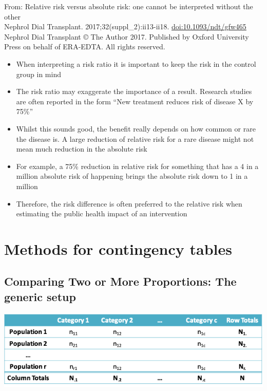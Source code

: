 \documentclass[
]{book}
\providecommand{\tightlist}{%
  \setlength{\itemsep}{0pt}\setlength{\parskip}{0pt}}
\begin{document}
From: Relative risk versus absolute risk: one cannot be interpreted without the other\\
Nephrol Dial Transplant. 2017;32(suppl\_2):ii13-ii18. \url{doi:10.1093/ndt/gfw465}\\
Nephrol Dial Transplant \textbar{} © The Author 2017. Published by Oxford University Press on behalf of ERA-EDTA. All rights reserved.

\begin{itemize}
\tightlist
\item
  When interpreting a risk ratio it is important to keep the risk in the control group in mind
\item
  The risk ratio may exaggerate the importance of a result. Research studies are often reported in the form ``New treatment reduces risk of disease X by 75\%''
\item
  Whilst this sounds good, the benefit really depends on how common or rare the disease is. A large reduction of relative risk for a rare disease might not mean much reduction in the absolute risk
\item
  For example, a 75\% reduction in relative risk for something that has a 4 in a million absolute risk of happening brings the absolute risk down to 1 in a million
\item
  Therefore, the risk difference is often preferred to the relative risk when estimating the public health impact of an intervention
\end{itemize}

\hypertarget{methods-for-contingency-tables}{%
\section{Methods for contingency tables}\label{methods-for-contingency-tables}}

\hypertarget{comparing-two-or-more-proportions-the-generic-setup}{%
\subsection{Comparing Two or More Proportions: The generic setup}\label{comparing-two-or-more-proportions-the-generic-setup}}

\includegraphics[width=1\linewidth]{./8_20}
\end{document}
